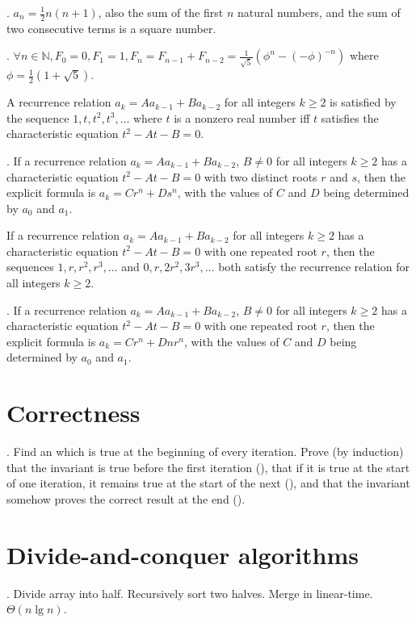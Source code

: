 \documentclass[fleqn]{slnotes}
\begin{document}
. \(a_n = \frac{1}{2}n(n+1)\), also the sum of the first \(n\) natural numbers, and the sum of two consecutive terms is a square number.

. \(\forall n \in \mathbb{N}, F_0 = 0, F_1 = 1, F_n = F_{n-1} + F_{n-2} = \frac{1}{\sqrt 5}(\phi^n - (-\phi)^{-n})\) where \(\phi = \frac{1}{2}(1 + \sqrt5)\).

A recurrence relation \(a_k = Aa_{k-1} + Ba_{k-2}\) for all integers \(k \ge 2\) is satisfied by the sequence \(1, t, t^2, t^3, \hdots\) where \(t\) is a nonzero real number iff \(t\) satisfies the characteristic equation \(t^2 - At - B = 0\).

. If a recurrence relation \(a_k = Aa_{k-1} + Ba_{k-2}\), \(B \neq 0\) for all integers \(k \ge 2\) has a characteristic equation \(t^2 - At - B = 0\) with two distinct roots \(r\) and \(s\), then the explicit formula is \(a_k = Cr^n + Ds^n\), with the values of \(C\) and \(D\) being determined by \(a_0\) and \(a_1\).

If a recurrence relation \(a_k = Aa_{k-1} + Ba_{k-2}\) for all integers \(k \ge 2\) has a characteristic equation \(t^2 - At - B = 0\) with one repeated root \(r\), then the sequences \(1, r, r^2, r^3, \hdots\) and \(0, r, 2r^2, 3r^3, \hdots\) both satisfy the recurrence relation for all integers \(k \ge 2\).

. If a recurrence relation \(a_k = Aa_{k-1} + Ba_{k-2}\), \(B \neq 0\) for all integers \(k \ge 2\) has a characteristic equation \(t^2 - At - B = 0\) with one repeated root \(r\), then the explicit formula is \(a_k = Cr^n + Dnr^n\), with the values of \(C\) and \(D\) being determined by \(a_0\) and \(a_1\).

\chapter{Correctness}
. Find an  which is true at the beginning of every iteration. Prove (by induction) that the invariant is true before the first iteration (), that if it is true at the start of one iteration, it remains true at the start of the next (), and that the invariant somehow proves the correct result at the end ().

\chapter{Divide-and-conquer algorithms}
. Divide array into half. Recursively sort two halves. Merge in linear-time. \(\Theta(n \lg n)\).
\end{document}
